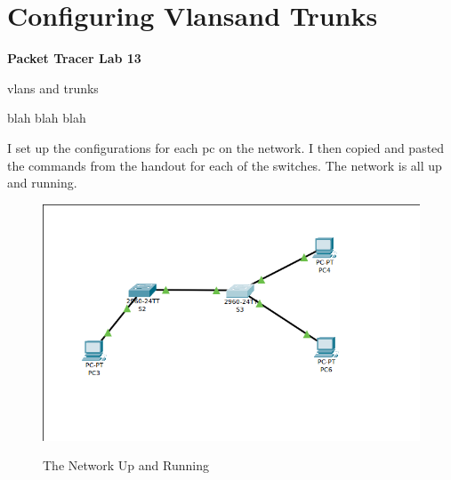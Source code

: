 \documentclass[../EngineeringJournal_CDavis.tex]{subfiles}
\begin{document}

\chapter[Configuring Vlans and Trunks]{Configuring Vlans\linebreak[1] and
Trunks \hspace*{\fill March 4, 2020}}
\noindent\textbf{{Packet Tracer Lab 13} }                             


\hspace{0.2cm}
\begin{tcolorbox}[width=6.3in]
\scriptsize 
vlans and trunks
  \begin{outline}
    \1 blah blah blah
  \end{outline}
\end{tcolorbox}
\hspace{0.2cm}
\normalsize  
  
\clearpage


I set up the configurations for each pc on the network. I then copied and
pasted the commands from the handout for each of the switches.
The network is all up and running.

\begin{figure}[!h]
  \centering
  {\label{run13}\includegraphics[width=.45\linewidth]{Figures/2020-03-08-183211_671x421_scrot.png}}
  \caption{The Network Up and Running}
\end{figure}


\end{document}
